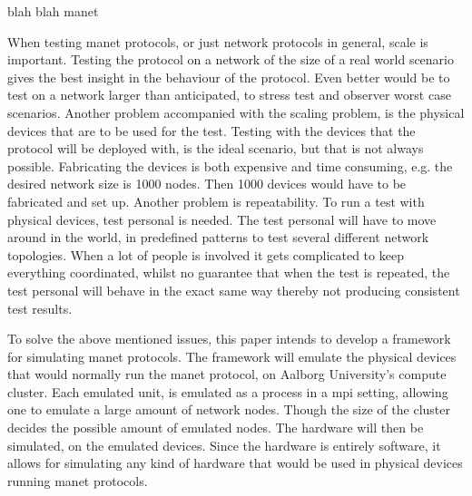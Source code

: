 




blah blah \gls{manet}\medbreak


When testing \gls{manet} protocols, or just network protocols in general, scale is important. Testing the protocol on a network of the size of a real world scenario gives the best insight in the behaviour of the protocol. Even better would be to test on a network larger than anticipated, to stress test and observer worst case scenarios.
Another problem accompanied with the scaling problem, is the physical devices that are to be used for the test. Testing with the devices that the protocol will be deployed with, is the ideal scenario, but that is not always possible. Fabricating the devices is both expensive and time consuming, e.g. the desired network size is 1000 nodes. Then 1000 devices would have to be fabricated and set up.
Another problem is repeatability. To run a test with physical devices, test personal is needed. The test personal will have to move around in the world, in predefined patterns to test several different network topologies. When a lot of people is involved it gets complicated to keep everything coordinated, whilst no guarantee that when the test is repeated, the test personal will behave in the exact same way thereby not producing consistent test results.\medbreak

To solve the above mentioned issues, this paper intends to develop a framework for simulating \gls{manet} protocols. The framework will emulate the physical devices that would normally run the \gls{manet} protocol, on Aalborg University's compute cluster. Each emulated unit, is emulated as a process in a \gls{mpi} setting, allowing one to emulate a large amount of network nodes. Though the size of the cluster decides the possible amount of emulated nodes. The hardware will then be simulated, on the emulated devices. Since the hardware is entirely software, it allows for simulating any kind of hardware that would be used in physical devices running \gls{manet} protocols.\medbreak


